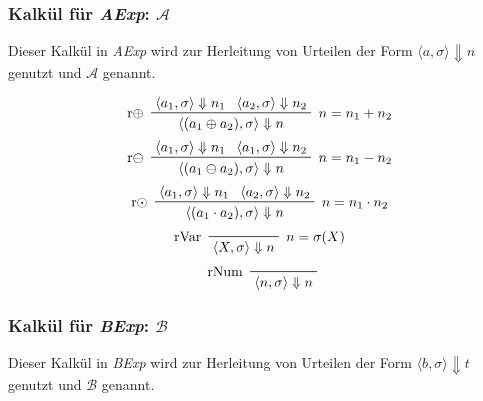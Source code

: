 									\subsubsection{Kalkül für \textit{AExp}: $ \mathcal{A} $}
										Dieser Kalkül in \textit{AExp} wird zur Herleitung von Urteilen der Form $ \langle a, \sigma \rangle \Downarrow n $ genutzt und $ \mathcal{A} $ genannt.

										\begin{multicols}{2}
											\begin{equation*}
												\prftree[l, r]
												{ $ n = n _ 1 + n _ 2 $ }
												{ r$ \oplus $ }
												{ \langle a _ 1, \sigma \rangle \Downarrow n _ 1 }
												{ \langle a _ 2, \sigma \rangle \Downarrow n _ 2 }
												{ \langle (a _ 1 \oplus a _ 2), \sigma \rangle \Downarrow n }
											\end{equation*}
											\begin{equation*}
												\prftree[l, r]
												{ $ n = n _ 1 - n _ 2 $ }
												{ r$ \ominus $ }
												{ \langle a _ 1, \sigma \rangle \Downarrow n _ 1 }
												{ \langle a _ 1, \sigma \rangle \Downarrow n _ 2 }
												{ \langle (a _ 1 \ominus a _ 2), \sigma \rangle \Downarrow n }
											\end{equation*}
											\begin{equation*}
												\prftree[l, r]
												{ $ n = n _ 1 \cdot n _ 2 $ }
												{ r$ \odot $ }
												{ \langle a _ 1, \sigma \rangle \Downarrow n _ 1 }
												{ \langle a _ 2, \sigma \rangle \Downarrow n _ 2 }
												{ \langle (a _ 1 \cdot a _ 2), \sigma \rangle \Downarrow n }
											\end{equation*}
											\begin{equation*}
												\prftree[l, r]
												{ $ n  = \sigma(X) $ }
												{ rVar }
												{ \langle X, \sigma \rangle \Downarrow n }
											\end{equation*}
											\begin{equation*}
												\prftree[l]
												{ rNum }
												{ \langle n, \sigma \rangle \Downarrow n }
											\end{equation*}
										\end{multicols}

									\subsubsection{Kalkül für \textit{BExp}: $ \mathcal{B} $}
										Dieser Kalkül in \textit{BExp} wird zur Herleitung von Urteilen der Form $ \langle b, \sigma \rangle \Downarrow t $ genutzt und $ \mathcal{B} $ genannt.

